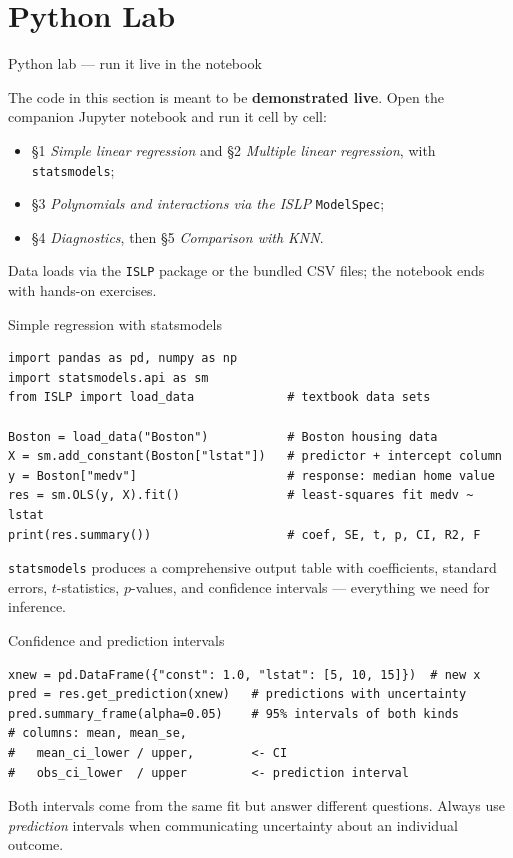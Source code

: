 \documentclass[aspectratio=169,11pt]{beamer}
\begin{document}
\section{Python Lab}

\begin{frame}{Python lab --- run it live in the notebook}
  \begin{labnote}
    The code in this section is meant to be \textbf{demonstrated live}. Open the companion Jupyter notebook and run it cell by cell:
    \begin{itemize}
      \item \S1 \emph{Simple linear regression} and \S2 \emph{Multiple linear regression}, with \texttt{statsmodels};
      \item \S3 \emph{Polynomials and interactions via the ISLP} \texttt{ModelSpec};
      \item \S4 \emph{Diagnostics}, then \S5 \emph{Comparison with KNN}.
    \end{itemize}
    Data loads via the \texttt{ISLP} package or the bundled CSV files; the notebook ends with hands-on exercises.
  \end{labnote}
\end{frame}



\begin{frame}[fragile]{Simple regression with statsmodels}
  \begin{lstlisting}
import pandas as pd, numpy as np
import statsmodels.api as sm
from ISLP import load_data             # textbook data sets

Boston = load_data("Boston")           # Boston housing data
X = sm.add_constant(Boston["lstat"])   # predictor + intercept column
y = Boston["medv"]                     # response: median home value
res = sm.OLS(y, X).fit()               # least-squares fit medv ~ lstat
print(res.summary())                   # coef, SE, t, p, CI, R2, F
  \end{lstlisting}
  \texttt{statsmodels} produces a comprehensive output table with
  coefficients, standard errors, $t$-statistics, $p$-values, and
  confidence intervals --- everything we need for inference.
\end{frame}

\begin{frame}[fragile]{Confidence and prediction intervals}
  \begin{lstlisting}
xnew = pd.DataFrame({"const": 1.0, "lstat": [5, 10, 15]})  # new x
pred = res.get_prediction(xnew)   # predictions with uncertainty
pred.summary_frame(alpha=0.05)    # 95% intervals of both kinds
# columns: mean, mean_se,
#   mean_ci_lower / upper,        <- CI
#   obs_ci_lower  / upper         <- prediction interval
  \end{lstlisting}
  Both intervals come from the same fit but answer different
  questions. Always use \emph{prediction} intervals when communicating
  uncertainty about an individual outcome.
\end{frame}
\end{document}
